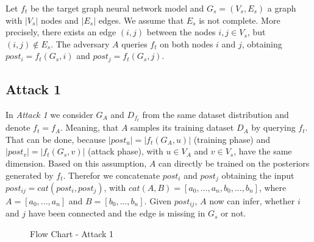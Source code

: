     Let $f_t$ be the target graph neural network model and $G_s = (V_s, E_s)$ a graph with $|V_s|$ nodes and $|E_s|$ edges.
    We assume that $E_s$ is not complete. 
    More precisely, there exists an edge $(i,j)$ between the nodes $i,j \in V_s$, but $(i,j) \not\in E_s$.
    The adversary $A$ queries $f_t$ on both nodes $i$ and $j$, obtaining $post_i = f_t(G_s, i)$ and $post_j = f_t(G_s, j)$.

    \subsection{Attack 1}
      In \emph{Attack 1} we consider $G_A$ and $D_{f_t}$ from the same dataset distribution and denote $f_t = f_A$.
      Meaning, that $A$ samples its training dataset $D_A$ by querying $f_t$.
      That can be done, because $|post_u| = |f_t(G_A,u)|$ (training phase) and $|post_v| = |f_t(G_s,v)|$ (attack phase), with $u \in V_A$ and $v \in V_s$, have the same dimension.
      Based on this assumption, $A$ can directly be trained on the posteriors generated by $f_t$.
      Therefor we concatenate $post_i$ and $post_j$ obtaining the input $post_{ij} = cat(post_i, post_j)$, with $cat(A,B) = [a_0,...,a_n,b_0,...,b_n]$, where $A = [a_0,...,a_n]$ and $B = [b_0,...,b_n]$. 
      Given $post_{ij}$, $A$ now can infer, whether $i$ and $j$ have been connected and the edge is missing in $G_s$ or not.

      \begin{figure}[h!]
        \caption{Flow Chart - Attack 1}
        \label{figure:flow-chart-attack-1}
      \end{figure}

